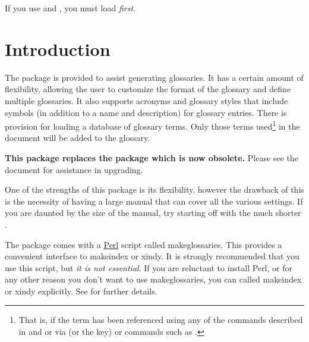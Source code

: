 \documentclass{nlctdoc}
\newcommand*{\gloskey}[2][newglossaryentry]{\csopt{#1}{#2}}
\begin{document}
\begin{important}
If you use  and , you must load
 \emph{first}.
\end{important}

\clearpage
\tableofcontents

\clearpage
\printglossaries

 \section{Introduction}

The  package is provided to assist generating
glossaries. It has a certain amount of flexibility, allowing the
user to customize the format of the glossary and define multiple
glossaries. It also supports acronyms and glossary styles that
include symbols (in addition to a name and description) for glossary
entries. There is provision for loading a database of glossary
terms. Only those terms used\footnote{That is, if the term has been
referenced using any of the commands described in
 and  or via
 (or the \gloskey{see} key) or commands such as
.} in the document will be added to the glossary.

\textbf{This package replaces the  package which is
now obsolete.} Please see the document  for
assistance in upgrading.

One of the strengths of this package is its flexibility, however
the drawback of this is the necessity of having a large manual
that can cover all the various settings. If you are daunted by the
size of the manual, try starting off with the much shorter
.

\begin{important}
The  package comes with a
\href{http://www.perl.org/about.html}{Perl} script called
\gls{makeglossaries}. This provides a convenient interface to
\gls{makeindex} or \gls{xindy}. It is strongly recommended
that you use this script, but \emph{it is not essential}. If you are
reluctant to install Perl, or for any other reason you don't want to
use \gls*{makeglossaries}, you can called \gls*{makeindex} or
\gls*{xindy} explicitly. See  for
further details.
\end{important}
\end{document}
